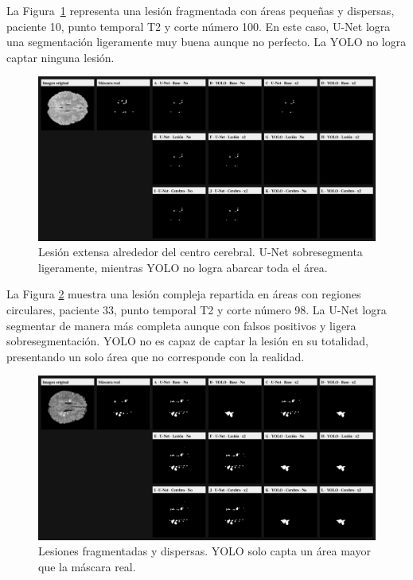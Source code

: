 \documentclass[../main.tex]{subfiles}
\begin{document}
La Figura~\ref{fig:P10_T2_Z100_matriz_12exps} representa una lesión fragmentada con áreas pequeñas y dispersas, paciente 10, punto temporal T2 y corte número 100. En este caso, U-Net logra una segmentación ligeramente muy buena aunque no perfecto. La YOLO no logra captar ninguna lesión.

\begin{figure}[H]
    \centering
    \includegraphics[width=1\linewidth]{imgs/resultados/comp/P10_T2_Z100_matriz_12exps.png}
    \caption{Lesión extensa alrededor del centro cerebral. U-Net sobresegmenta ligeramente, mientras YOLO no logra abarcar toda el área.}
    \label{fig:P10_T2_Z100_matriz_12exps}
\end{figure}

La Figura \ref{fig:P33_T2_Z98_matriz_12exps} muestra una lesión compleja repartida en áreas con regiones circulares, paciente 33, punto temporal T2 y corte número 98. La U-Net logra segmentar de manera más completa aunque con falsos positivos y ligera sobresegmentación. YOLO no es capaz de captar la lesión en su totalidad, presentando un solo área que no corresponde con la realidad.

\begin{figure}[H]
    \centering
    \includegraphics[width=1\linewidth]{imgs/resultados/comp/P33_T2_Z98_matriz_12exps.png}
    \caption{Lesiones fragmentadas y dispersas. YOLO solo capta un área mayor que la máscara real.}
    \label{fig:P33_T2_Z98_matriz_12exps}
\end{figure}
\end{document}
